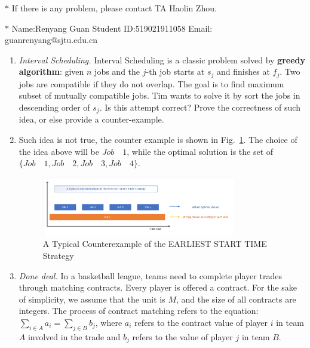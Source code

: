 \documentclass[12pt,a4paper]{article}
\makeatletter
\newtheorem*{solution}{Solution}
\theoremstyle{definition}
\renewenvironment{solution}[1][Solution] {\par\pushQED{\qed}\normalfont\topsep6\p@\@plus6\p@\relax\trivlist\item[\hskip\labelsep\bfseries#1\@addpunct{.}]\ignorespaces}{\popQED\endtrivlist\@endpefalse} \makeatother
\makeatother
\begin{document}
\noindent

\noindent{}


\begin{center}
\footnotesize{\color{red}$*$ If there is any problem, please contact TA Haolin Zhou.}\par
\footnotesize{\color{blue}$*$ Name:Renyang Guan  \quad Student ID:519021911058 \quad Email: guanrenyang@sjtu.edu.cn}
\end{center}

\begin{enumerate}
	\item \textit{Interval Scheduling.} Interval Scheduling is a classic problem solved by \textbf{greedy algorithm}: given $n$ jobs and the $j$-th job starts at $s_j$ and finishes at $f_j$. Two jobs are compatible if they do not overlap. The goal is to find maximum subset of mutually compatible jobs. Tim wants to solve it by sort the jobs in descending order of $s_j$. Is this attempt correct? Prove the correctness of such idea, or else provide a counter-example.
	    \begin{solution}
	    Such idea is not true, the counter example is shown in Fig.~\ref{Fig-CounterExample}. The choice of the idea above will be $Job\quad 1$, while the optimal solution is the set of $\{Job\quad1,  Job\quad 2, Job\quad3,  Job \quad 4\}$.
	        
\begin{figure}[htbp]
    \centering
    \includegraphics[width=0.8\textwidth]{Fig-CounterExample.pdf}
    \caption{A Typical Counterexample of the EARLIEST START TIME Strategy}\label{Fig-CounterExample}
\end{figure}
	    \end{solution}
	
	\item \textit{Done deal.} In a basketball league, teams need to complete player trades through matching contracts. Every player is offered a contract. For the sake of simplicity, we assume that the unit is $ M $, and the size of all contracts are integers. The process of contract matching refers to the equation: $ \sum_{i\in A} a_{i}=\sum_{j\in B} b_{j} $, where $ a_{i} $ refers to the contract value of player $ i $ in team $A$ involved in the trade and $ b_{j} $ refers to the value of player $ j $ in team $B$. 
	

\end{enumerate}
\end{document}
